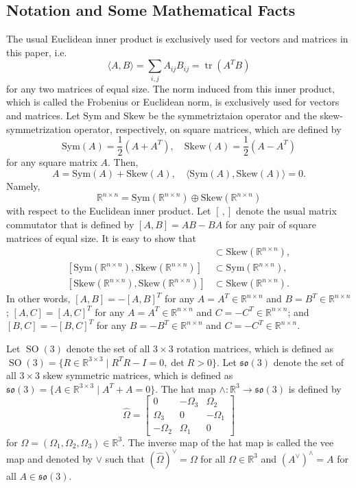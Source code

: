 \documentclass[letterpaper, 10 pt, conference]{ieeeconf}  %
\newcommand{\Sym}{\mathrm{Sym}}
\newcommand{\Skew}{\mathrm{Skew}}
\newcommand{\SO}{\operatorname{SO}(3)}
\begin{document}
\subsection{Notation and Some Mathematical Facts}
The usual Euclidean inner product is exclusively used for vectors and matrices in this paper, i.e.
\[
\langle A, B \rangle = \sum_{i,j}A_{ij}B_{ij} = \operatorname{tr}(A^TB)
\]
for any two matrices  of equal size.  The norm induced from this inner product, which is called the Frobenius or Euclidean norm, is exclusively used for vectors and matrices. Let $\Sym$ and $\Skew$ be the symmetriztaion operator and the skew-symmetrization operator, respectively, on square matrices, which are defined by
\[
\Sym (A) = \frac{1}{2}(A+A^T), \quad \Skew (A) = \frac{1}{2}(A-A^T)
\]
for any square matrix $A$.
Then,
\[
A  = \Sym (A) + \Skew(A), \quad \langle \Sym (A), \Skew (A) \rangle = 0.
\]
 Namely, 
\[
\mathbb R^{n\times n} = \Sym (\mathbb R^{n\times n} ) \oplus \Skew (\mathbb R^{n\times n} )
\]
with respect to the Euclidean inner product. Let $[\, , ]$ denote the usual matrix commutator that is defined by $[A,B] = AB-BA$ for any pair of square matrices of equal size. %
It is easy to show that
\begin{align*}
[\Sym (\mathbb R^{n\times n} ), \Sym (\mathbb R^{n\times n} )] &\subset \Skew (\mathbb R^{n\times n} ),\\
[\Sym (\mathbb R^{n\times n} ), \Skew (\mathbb R^{n\times n} )] &\subset \Sym (\mathbb R^{n\times n} ),\\
[\Skew (\mathbb R^{n\times n} ), \Skew (\mathbb R^{n\times n} )] &\subset \Skew (\mathbb R^{n\times n} ).
\end{align*}
In other words,  $[A,B] = -[A,B]^T$  for any $A = A^T \in \mathbb R^{n\times n}$ and $B = B^T \in \mathbb R^{n\times n}$; $[A,C] = [A,C]^T$ for any  $A = A^T \in \mathbb R^{n\times n}$ and $C = -C^T \in \mathbb R^{n\times n}$; and $[B,C] = -[B,C]^T$   for any  $B = -B^T \in \mathbb R^{n\times n}$ and  $C = -C^T \in \mathbb R^{n\times n}$. 

Let $\SO$ denote the set of all $3\times 3$ rotation matrices, which is defined as $\SO = \{ R\in \mathbb R^{3\times 3} \mid R^T R - I= 0, \det R>0\}$.  Let $\mathfrak{so}(3)$ denote the set of all $3\times 3$ skew symmetric matrices, which is defined as $\mathfrak{so}(3) = \{ A \in \mathbb R^{3\times 3} \mid A^T+ A = 0 \}$. The hat map $\wedge : \mathbb R^3 \rightarrow \mathfrak{so}(3)$ is defined by
\[
\hat \Omega = \begin{bmatrix}
0 & -\Omega_3 &\Omega_2 \\
\Omega_3 & 0 & -\Omega_1\\
-\Omega_2 & \Omega_1 & 0
\end{bmatrix}
\]
for $\Omega = (\Omega_1, \Omega_2,\Omega_3) \in \mathbb R^3$. The inverse map of the hat map is called the vee map and denoted by $\vee$ such that $(\hat \Omega)^\vee = \Omega$ for all $\Omega \in \mathbb R^3$ and $(A^\vee)^\wedge = A$ for all $A\in \mathfrak{so}(3)$.  
\end{document}
